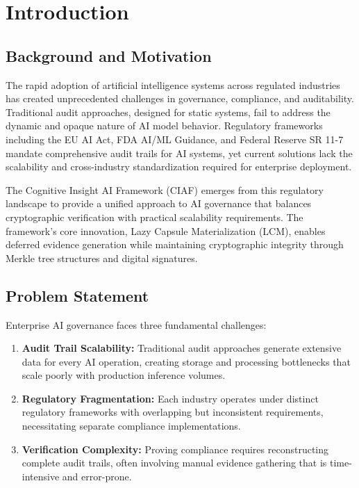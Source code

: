 \documentclass[12pt,a4paper]{article}
\begin{document}
\newpage
\tableofcontents
\newpage

\section{Introduction}

\subsection{Background and Motivation}

The rapid adoption of artificial intelligence systems across regulated industries has created unprecedented challenges in governance, compliance, and auditability. Traditional audit approaches, designed for static systems, fail to address the dynamic and opaque nature of AI model behavior. Regulatory frameworks including the EU AI Act, FDA AI/ML Guidance, and Federal Reserve SR 11-7 mandate comprehensive audit trails for AI systems, yet current solutions lack the scalability and cross-industry standardization required for enterprise deployment.

The Cognitive Insight AI Framework (CIAF) emerges from this regulatory landscape to provide a unified approach to AI governance that balances cryptographic verification with practical scalability requirements. The framework's core innovation, Lazy Capsule Materialization (LCM\texttrademark), enables deferred evidence generation while maintaining cryptographic integrity through Merkle tree structures and digital signatures.

\subsection{Problem Statement}

Enterprise AI governance faces three fundamental challenges:

\begin{enumerate}
\item \textbf{Audit Trail Scalability:} Traditional audit approaches generate extensive data for every AI operation, creating storage and processing bottlenecks that scale poorly with production inference volumes.

\item \textbf{Regulatory Fragmentation:} Each industry operates under distinct regulatory frameworks with overlapping but inconsistent requirements, necessitating separate compliance implementations.

\item \textbf{Verification Complexity:} Proving compliance requires reconstructing complete audit trails, often involving manual evidence gathering that is time-intensive and error-prone.
\end{enumerate}
\end{document}
